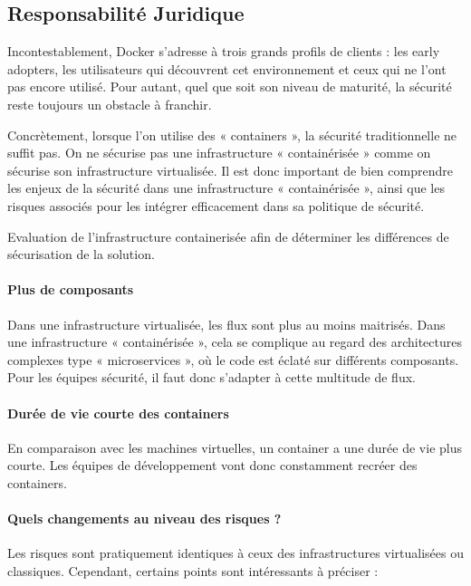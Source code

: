 \subsection{Responsabilité Juridique}

Incontestablement, Docker s'adresse à trois grands profils de clients :
les early adopters, les utilisateurs qui découvrent cet environnement et
ceux qui ne l'ont pas encore utilisé. Pour autant, quel que soit son
niveau de maturité, la sécurité reste toujours un obstacle à franchir.

Concrètement, lorsque l'on utilise des « containers », la sécurité
traditionnelle ne suffit pas. On ne sécurise pas une infrastructure «
containérisée » comme on sécurise son infrastructure virtualisée. Il est
donc important de bien comprendre les enjeux de la sécurité dans une
infrastructure « containérisée », ainsi que les risques associés pour
les intégrer efficacement dans sa politique de sécurité.

Evaluation de l'infrastructure containerisée afin de déterminer les
différences de sécurisation de la solution.

\paragraph{Plus de composants}

Dans une infrastructure virtualisée, les flux sont plus au moins
maitrisés. Dans une infrastructure « containérisée », cela se complique
au regard des architectures complexes type « microservices », où le code
est éclaté sur différents composants. Pour les équipes sécurité, il faut
donc s'adapter à cette multitude de flux.

\paragraph{Durée de vie courte des containers}

En comparaison avec les machines virtuelles, un container a une durée de
vie plus courte. Les équipes de développement vont donc constamment
recréer des containers.

\paragraph{Quels changements au niveau des risques ?}

Les risques sont pratiquement identiques à ceux des infrastructures
virtualisées ou classiques. Cependant, certains points sont intéressants
à préciser :


